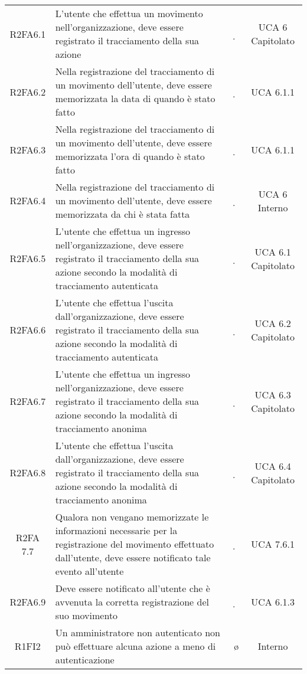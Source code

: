 {\begin{longtable}{ c C{4cm} c c}
R2FA6.1 & L’utente che effettua un movimento nell’organizzazione, deve essere registrato il tracciamento della sua azione & \d & UCA 6 Capitolato \\

R2FA6.2 & Nella registrazione del tracciamento di un movimento dell’utente, deve essere memorizzata la data di quando è stato fatto & \d & UCA 6.1.1 \\

R2FA6.3 & Nella registrazione del tracciamento di un movimento dell’utente, deve essere memorizzata l’ora di quando è stato fatto & \d & UCA 6.1.1 \\

R2FA6.4 & Nella registrazione del tracciamento di un movimento dell’utente, deve essere memorizzata da chi è stata fatta & \d & UCA 6 Interno \\

R2FA6.5 & L’utente che effettua un ingresso nell’organizzazione, deve essere registrato il tracciamento della sua azione secondo la modalità di tracciamento autenticata & \d & UCA 6.1 Capitolato \\

R2FA6.6 & L’utente che effettua l’uscita dall’organizzazione, deve essere registrato il tracciamento della sua azione secondo la modalità di tracciamento autenticata & \d & UCA 6.2 Capitolato \\

R2FA6.7 & L’utente che effettua un ingresso nell’organizzazione, deve essere registrato il tracciamento della sua azione secondo la modalità di tracciamento anonima & \d & UCA 6.3 Capitolato \\

R2FA6.8 & L’utente che effettua l’uscita dall’organizzazione, deve essere registrato il tracciamento della sua azione secondo la modalità di tracciamento anonima & \d & UCA 6.4 Capitolato \\

R2FA 7.7 & Qualora non vengano memorizzate le informazioni necessarie per la registrazione del movimento effettuato dall’utente, deve essere notificato tale evento all’utente & \d & UCA 7.6.1 \\

R2FA6.9 & Deve essere notificato all’utente che è avvenuta la corretta registrazione del suo movimento & \d & UCA 6.1.3 \\


R1FI2 & Un amministratore non autenticato non può effettuare alcuna azione a meno di autenticazione & \o & Interno \\


\end{longtable}}
